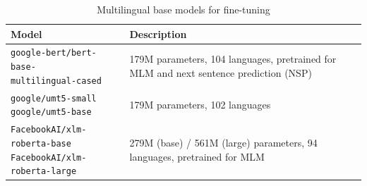 \documentclass[11pt]{article}
\begin{document}
\begin{table}[h]
    \centering    
    \captionsetup{justification=centering, singlelinecheck=false}    \renewcommand{\arraystretch}{1.5}  %
       \begin{tabular}{|l|p{8.5cm}|}
        \hline
        \textbf{Model} & \textbf{Description} \\ \hline\hline
        \multicolumn{1}{|p{5.3cm}|}{\parbox[t]{6cm}{\texttt{google-bert/bert-base-\\multilingual-cased}}} & 179M parameters, 104 languages, pretrained for MLM and next sentence prediction (NSP) \cite{DBLP:journals/corr/abs-1810-04805} \\ \hline
        \multirow{2}{*}{\parbox[t]{6cm}{\texttt{google/umt5-small} \\ \texttt{google/umt5-base}}} & \multirow{2}{8.5cm}{179M parameters, 102 languages \cite{chung2023unimax}}\\ \cline{1-1}
        & \\ \hline
        \multirow{2}{*}{\parbox[t]{6cm}{\texttt{FacebookAI/xlm-roberta-base} \\ \texttt{FacebookAI/xlm-roberta-large}}} & \multirow{2}{8.5cm}{279M (base) / 561M (large) parameters, 94 languages, pretrained for MLM \cite{DBLP:journals/corr/abs-1911-02116}}\\ \cline{1-1}
        & \\ \hline
    \end{tabular}
    \caption{Multilingual base models for fine-tuning}
    \label{tab:multilingual_models}
\end{table}

\twocolumn
\clearpage
\raggedright
\end{document}
